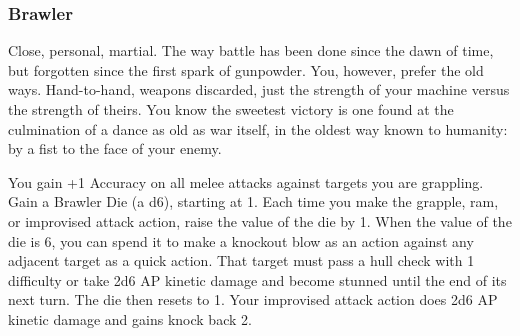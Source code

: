 \subsubsection{Brawler}

\begin{talent}
{Close, personal, martial. The way battle has been done since the dawn of time, but forgotten since the first spark of gunpowder. You, however, prefer the old ways. Hand-to-hand, weapons discarded, just the strength of your machine versus the strength of theirs. You know the sweetest victory is one found at the culmination of a dance as old as war itself, in the oldest way known to humanity: by a fist to the face of your enemy.}

You gain +1 Accuracy on all melee attacks against targets you are grappling.
Gain a Brawler Die (a d6), starting at 1. Each time you make the grapple, ram, or improvised attack action, raise the value of the die by 1. When the value of the die is 6, you can spend it to make a knockout blow as an action against any adjacent target as a quick action. That target must pass a hull check with 1 difficulty or take 2d6 AP kinetic damage and become stunned until the end of its next turn. The die then resets to 1.
Your improvised attack action does 2d6 AP kinetic damage and gains knock back 2.

\end{talent}